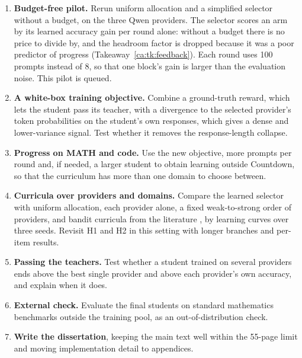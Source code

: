 \begin{enumerate}[itemsep=3pt,topsep=3pt]
  \item \textbf{Budget-free pilot.} Rerun uniform allocation and a simplified selector
    without a budget, on the three Qwen providers. The selector scores an arm by its
    learned accuracy gain per round alone: without a budget there is no price to divide
    by, and the headroom factor is dropped because it was a poor predictor of progress
    (Takeaway~\ref{ca:tk:feedback}). Each round uses 100 prompts instead of 8, so that one
    block's gain is larger than the evaluation noise. This pilot is queued.
  \item \textbf{A white-box training objective.} Combine a ground-truth reward, which lets
    the student pass its teacher, with a divergence to the selected provider's token
    probabilities on the student's own responses, which gives a dense and lower-variance
    signal. Test whether it removes the response-length collapse.
  \item \textbf{Progress on MATH and code.} Use the new objective, more prompts per round
    and, if needed, a larger student to obtain learning outside Countdown, so that the
    curriculum has more than one domain to choose between.
  \item \textbf{Curricula over providers and domains.} Compare the learned selector with
    uniform allocation, each provider alone, a fixed weak-to-strong order of providers,
    and bandit curricula from the literature
    \autocite{matiisen_tscl_2017,chen_sec_2025}, by learning curves over three seeds.
    Revisit H1 and H2 in this setting with longer branches and per-item results.
  \item \textbf{Passing the teachers.} Test whether a student trained on several
    providers ends above the best single provider and above each provider's own accuracy,
    and explain when it does.
  \item \textbf{External check.} Evaluate the final students on standard mathematics
    benchmarks outside the training pool, as an out-of-distribution check.
  \item \textbf{Write the dissertation}, keeping the main text well within the 55-page
    limit and moving implementation detail to appendices.
\end{enumerate}

